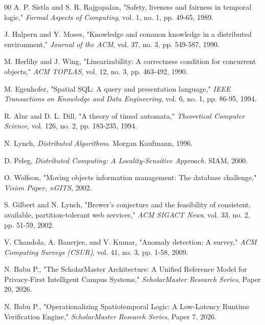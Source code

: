 \documentclass[conference]{IEEEtran}
\begin{document}
\begin{thebibliography}{00}
 A. P. Sistla and S. R. Rajgopalan, "Safety, liveness and fairness in temporal logic," \textit{Formal Aspects of Computing}, vol. 1, no. 1, pp. 49-65, 1989.

 J. Halpern and Y. Moses, "Knowledge and common knowledge in a distributed environment," \textit{Journal of the ACM}, vol. 37, no. 3, pp. 549-587, 1990.

 M. Herlihy and J. Wing, "Linearizability: A correctness condition for concurrent objects," \textit{ACM TOPLAS}, vol. 12, no. 3, pp. 463-492, 1990.

 M. Egenhofer, "Spatial SQL: A query and presentation language," \textit{IEEE Transactions on Knowledge and Data Engineering}, vol. 6, no. 1, pp. 86-95, 1994.

 R. Alur and D. L. Dill, "A theory of timed automata," \textit{Theoretical Computer Science}, vol. 126, no. 2, pp. 183-235, 1994.

 N. Lynch, \textit{Distributed Algorithms}. Morgan Kaufmann, 1996.

 D. Peleg, \textit{Distributed Computing: A Locality-Sensitive Approach}. SIAM, 2000.

 O. Wolfson, "Moving objects information management: The database challenge," \textit{Vision Paper, nGITS}, 2002.

 S. Gilbert and N. Lynch, "Brewer's conjecture and the feasibility of consistent, available, partition-tolerant web services," \textit{ACM SIGACT News}, vol. 33, no. 2, pp. 51-59, 2002.

 V. Chandola, A. Banerjee, and V. Kumar, "Anomaly detection: A survey," \textit{ACM Computing Surveys (CSUR)}, vol. 41, no. 3, pp. 1-58, 2009.

 N. Babu P., "The ScholarMaster Architecture: A Unified Reference Model for Privacy-First Intelligent Campus Systems," \textit{ScholarMaster Research Series}, Paper 20, 2026.

 N. Babu P., "Operationalizing Spatiotemporal Logic: A Low-Latency Runtime Verification Engine," \textit{ScholarMaster Research Series}, Paper 7, 2026.

\end{thebibliography}
\end{document}
